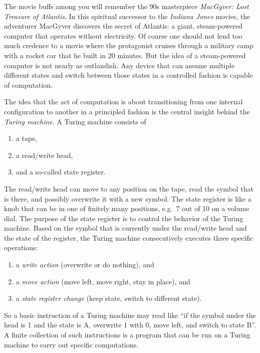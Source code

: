The movie buffs among you will remember the 90s masterpiece \emph{MacGyver: Lost Treasure of Atlantis}.
In this spiritual successor to the \emph{Indiana Jones} movies, the adventurer MacGyver discovers the secret of Atlantis: a giant, steam-powered computer that operates without electricity.
Of course one should not lend too much credence to a movie where the protagonist cruises through a military camp with a rocket car that he built in 20 minutes.
But the idea of a steam-powered computer is not nearly as outlandish.
Any device that can assume multiple different states and switch between those states in a controlled fashion is capable of computation.

The idea that the act of computation is about transitioning from one internal configuration to another in a principled fashion is the central insight behind the \emph{Turing machine}.
A Turing machine consists of
%
\begin{enumerate}
    \item a tape,
    \item a read/write head,
    \item and a so-called state register.
\end{enumerate}
%
The read/write head can move to any position on the tape, read the symbol that is there, and possibly overwrite it with a new symbol.
The state register is like a knob that can be in one of finitely many positions, e.g.\ 7 out of 10 on a volume dial.
The purpose of the state register is to control the behavior of the Turing machine.
Based on the symbol that is currently under the read/write head and the state of the register, the Turing machine consecutively executes three specific operations: 
%
\begin{enumerate}
    \item a \emph{write action} (overwrite or do nothing), and
    \item a \emph{move action} (move left, move right, stay in place), and
    \item a \emph{state register change} (keep state, switch to different state).
\end{enumerate}
%
So a basic instruction of a Turing machine may read like ``if the symbol under the head is 1 and the state is A, overwrite 1 with 0, move left, and switch to state B''.
A finite collection of such instructions is a program that can be run on a Turing machine to carry out specific computations.

